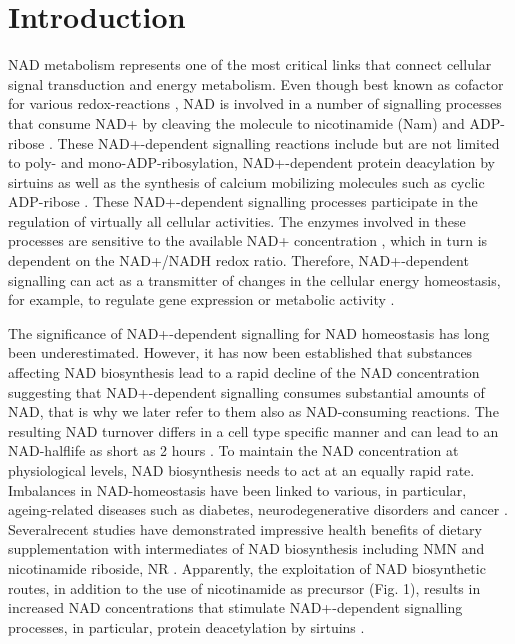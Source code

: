 
\section{Introduction}

NAD metabolism represents one of the most critical links that connect cellular signal transduction and energy metabolism.  Even though best known as cofactor for various redox-reactions , NAD is involved in a number of signalling processes that consume NAD+ by cleaving the molecule to nicotinamide (Nam) and ADP-ribose \cite{Verdin2015}. These NAD+-dependent signalling reactions include but are not limited to poly- and mono-ADP-ribosylation, NAD+-dependent protein deacylation by sirtuins as well as the synthesis of calcium mobilizing molecules such as cyclic ADP-ribose \cite{Opitz2015}. These NAD+-dependent signalling processes participate in the regulation of virtually all cellular activities. The enzymes involved in these processes are sensitive to the available NAD+ concentration \cite{Ruggieri2015}, which in turn is dependent on the NAD+/NADH redox ratio. Therefore, NAD+-dependent signalling can act as a transmitter of changes in the cellular energy homeostasis, for example, to regulate gene expression or metabolic activity \cite{Koch-Nolte2009}.

The significance of NAD+-dependent signalling for NAD homeostasis has long been underestimated. However, it has now been established that substances affecting NAD biosynthesis  lead to a rapid decline  of the NAD concentration \cite{Vacor2018} suggesting that NAD+-dependent signalling consumes substantial amounts of NAD, that is why we later refer to them also as NAD-consuming reactions. The resulting NAD turnover differs in a cell type specific manner and can lead to an NAD-halflife as short as 2 hours  \cite{Rabinowitz2018}. To maintain the NAD concentration at physiological levels, NAD biosynthesis needs to act at an equally rapid rate. Imbalances in NAD-homeostasis have been linked to various, in particular, ageing-related diseases such as diabetes, neurodegenerative disorders and cancer \cite{Chiarugi2012,Verdin2015}. Severalrecent studies have demonstrated impressive health benefits of dietary supplementation with intermediates of NAD biosynthesis including NMN and nicotinamide riboside, NR \cite{ImaiCellmetab2018}. Apparently, the exploitation of NAD biosynthetic routes, in addition to the use of nicotinamide as precursor (Fig. 1), results in increased NAD concentrations that stimulate NAD+-dependent signalling processes, in particular, protein deacetylation by sirtuins .

